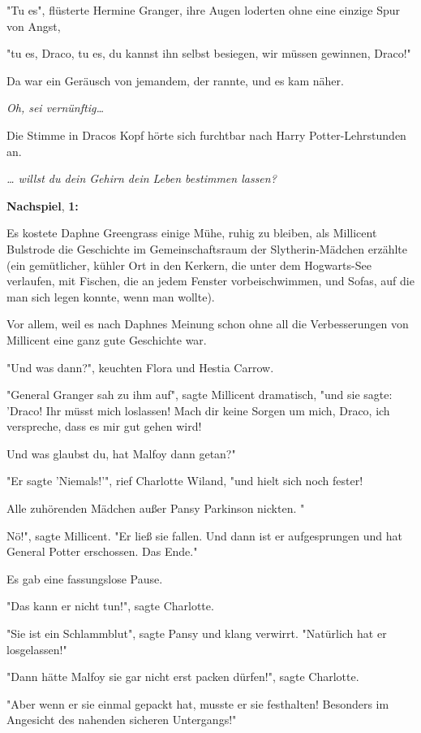 {"Tu es", flüsterte Hermine Granger, ihre Augen loderten ohne eine einzige Spur von Angst,

"tu es, Draco, tu es, du kannst ihn selbst besiegen, wir müssen gewinnen, Draco!"

Da war ein Geräusch von jemandem, der rannte, und es kam näher.

\emph{\hfill\break Oh, sei vernünftig…}

Die Stimme in Dracos Kopf hörte sich furchtbar nach Harry Potter-Lehrstunden an.

\emph{… willst du dein Gehirn dein Leben bestimmen lassen?}

\textbf{Nachspiel}, \textbf{1:}

Es kostete Daphne Greengrass einige Mühe, ruhig zu bleiben, als Millicent Bulstrode die Geschichte im Gemeinschaftsraum der Slytherin-Mädchen erzählte (ein gemütlicher, kühler Ort in den Kerkern, die unter dem Hogwarts-See verlaufen, mit Fischen, die an jedem Fenster vorbeischwimmen, und Sofas, auf die man sich legen konnte, wenn man wollte).

Vor allem, weil es nach Daphnes Meinung schon ohne all die Verbesserungen von Millicent eine ganz gute Geschichte war.

"Und was dann?", keuchten Flora und Hestia Carrow.

"General Granger sah zu ihm auf", sagte Millicent dramatisch, "und sie sagte: 'Draco! Ihr müsst mich loslassen! Mach dir keine Sorgen um mich, Draco, ich verspreche, dass es mir gut gehen wird!

Und was glaubst du, hat Malfoy dann getan?"

"Er sagte 'Niemals!'", rief Charlotte Wiland, "und hielt sich noch fester!

Alle zuhörenden Mädchen außer Pansy Parkinson nickten. "

Nö!", sagte Millicent. "Er ließ sie fallen. Und dann ist er aufgesprungen und hat General Potter erschossen. Das Ende."

Es gab eine fassungslose Pause.

"Das kann er nicht tun!", sagte Charlotte.

"Sie ist ein Schlammblut", sagte Pansy und klang verwirrt. "Natürlich hat er losgelassen!"

"Dann hätte Malfoy sie gar nicht erst packen dürfen!", sagte Charlotte.

"Aber wenn er sie einmal gepackt hat, musste er sie festhalten! Besonders im Angesicht des nahenden sicheren Untergangs!"

}

